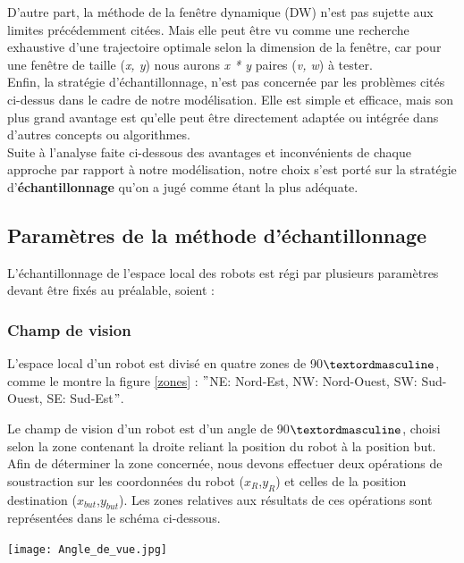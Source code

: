D'autre part, la méthode de la fenêtre dynamique (DW) n'est pas sujette aux limites précédemment citées. Mais elle peut être vu comme une recherche exhaustive d'une trajectoire optimale selon la dimension de la fenêtre, car pour une fenêtre de taille (\textit{x, y}) nous aurons \textit{x * y} paires (\textit{v, w}) à tester.\\

Enfin, la stratégie d'échantillonnage, n'est pas concernée par les problèmes cités ci-dessus dans le cadre de notre modélisation. Elle est simple et efficace, mais son plus grand avantage est qu'elle peut être directement adaptée ou intégrée dans d'autres concepts ou algorithmes.\\

Suite à l'analyse faite ci-dessous des avantages et inconvénients de chaque approche par rapport à notre modélisation, notre choix s'est porté sur la stratégie d'\textbf{échantillonnage} qu'on a jugé comme étant la plus adéquate.


\subsection{Paramètres de la méthode d'échantillonnage}
L'échantillonnage de l'espace local des robots est régi par plusieurs paramètres devant être fixés au préalable, soient : 

\subsubsection{Champ de vision}
L'espace local d'un robot est divisé en quatre zones de 90$\textordmasculine$, comme le montre la figure \ref{zones} : $"$NE: Nord-Est, NW: Nord-Ouest, SW: Sud-Ouest, SE: Sud-Est$"$.

Le champ de vision d'un robot est d'un angle de 90$\textordmasculine$, choisi selon la zone contenant la droite reliant la position du robot à la position but.\\

Afin de déterminer la zone concernée, nous devons effectuer deux opérations de soustraction sur les coordonnées du robot ($x_{R}$,$y_{R}$) et celles de la position destination ($x_{but}$,$y_{but}$).
Les zones relatives aux résultats de ces opérations sont représentées dans le schéma ci-dessous. 
\begin{center}	  
	\texttt{[image: Angle\_de\_vue.jpg]}%
	\vspace{-0.1 cm}
	\label{zones}%
\end{center}

